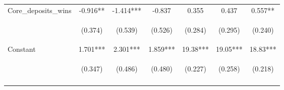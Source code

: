 \begin{tabular}{lcccccc}
Core\_deposits\_wins & -0.916** & -1.414*** & -0.837 & 0.355 & 0.437 & 0.557** \\
\vspace{4pt} & \begin{footnotesize}(0.374)\end{footnotesize} & \begin{footnotesize}(0.539)\end{footnotesize} & \begin{footnotesize}(0.526)\end{footnotesize} & \begin{footnotesize}(0.284)\end{footnotesize} & \begin{footnotesize}(0.295)\end{footnotesize} & \begin{footnotesize}(0.240)\end{footnotesize} \\
Constant & 1.701*** & 2.301*** & 1.859*** & 19.38*** & 19.05*** & 18.83*** \\
 & \begin{footnotesize}(0.347)\end{footnotesize} & \begin{footnotesize}(0.486)\end{footnotesize} & \begin{footnotesize}(0.480)\end{footnotesize} & \begin{footnotesize}(0.227)\end{footnotesize} & \begin{footnotesize}(0.258)\end{footnotesize} & \begin{footnotesize}(0.218)\end{footnotesize} \\
\vspace{4pt} & \begin{footnotesize}\end{footnotesize} & \begin{footnotesize}\end{footnotesize} & \begin{footnotesize}\end{footnotesize} & \begin{footnotesize}\end{footnotesize} & \begin{footnotesize}\end{footnotesize} & \begin{footnotesize}\end{footnotesize} \\

\end{tabular}
